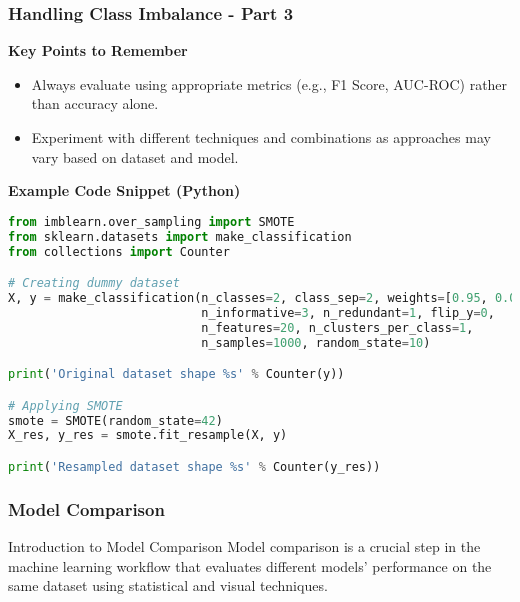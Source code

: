 \documentclass[aspectratio=169]{beamer}
\begin{document}
\begin{frame}[fragile]
    \frametitle{Handling Class Imbalance - Part 3}
    \textbf{Key Points to Remember}
    \begin{itemize}
        \item Always evaluate using appropriate metrics (e.g., F1 Score, AUC-ROC) rather than accuracy alone.
        \item Experiment with different techniques and combinations as approaches may vary based on dataset and model.
    \end{itemize}
    
    \textbf{Example Code Snippet (Python)}
    \begin{lstlisting}[language=Python]
from imblearn.over_sampling import SMOTE
from sklearn.datasets import make_classification
from collections import Counter

# Creating dummy dataset
X, y = make_classification(n_classes=2, class_sep=2, weights=[0.95, 0.05],
                           n_informative=3, n_redundant=1, flip_y=0,
                           n_features=20, n_clusters_per_class=1,
                           n_samples=1000, random_state=10)

print('Original dataset shape %s' % Counter(y))

# Applying SMOTE
smote = SMOTE(random_state=42)
X_res, y_res = smote.fit_resample(X, y)

print('Resampled dataset shape %s' % Counter(y_res))
    \end{lstlisting}
\end{frame}

\begin{frame}
    \frametitle{Model Comparison}
    \begin{block}{Introduction to Model Comparison}
        Model comparison is a crucial step in the machine learning workflow that evaluates different models' performance on the same dataset using statistical and visual techniques.
    \end{block}
\end{frame}
\end{document}
